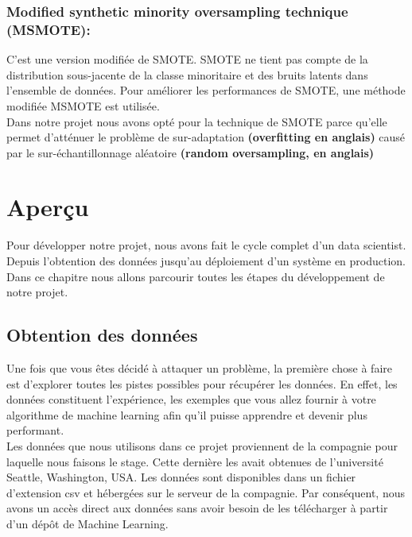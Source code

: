 \documentclass[12pt, french]{report}
\begin{document}
\subsection{Modified synthetic minority oversampling technique (MSMOTE):}
C'est une version modifiée de SMOTE. SMOTE ne tient pas compte de la distribution sous-jacente de la classe minoritaire et des bruits latents dans l'ensemble de données. Pour améliorer les performances de SMOTE, une méthode modifiée MSMOTE est utilisée.\\

Dans notre projet nous avons opté pour la technique de SMOTE parce qu'elle permet d'atténuer le problème de sur-adaptation \textbf{(overfitting en anglais)} causé par le sur-échantillonnage aléatoire \textbf{(random oversampling, en anglais)}
 




%
%
%
%
%







\newpage

\chapter{Aperçu}
Pour développer notre projet, nous avons fait le cycle complet d'un data scientist. Depuis l'obtention des données jusqu'au déploiement d'un système en production. Dans ce chapitre nous allons parcourir toutes les étapes du développement de notre projet. 

\section{Obtention des données}
Une fois que vous êtes décidé à attaquer un problème, la première chose à faire est d'explorer toutes les pistes possibles pour récupérer les données. En effet, les données constituent l'expérience, les exemples que vous allez fournir à votre algorithme de machine learning afin qu'il puisse apprendre et devenir plus performant.\\ 
Les données que nous utilisons dans ce projet proviennent de la compagnie pour laquelle nous faisons le stage. Cette dernière les avait obtenues de l'université Seattle, Washington, USA. Les données sont disponibles dans un fichier d'extension csv et hébergées sur le serveur de la compagnie. Par conséquent, nous avons un accès direct aux données sans avoir besoin de les télécharger à partir d'un dépôt de Machine Learning.
\end{document}
